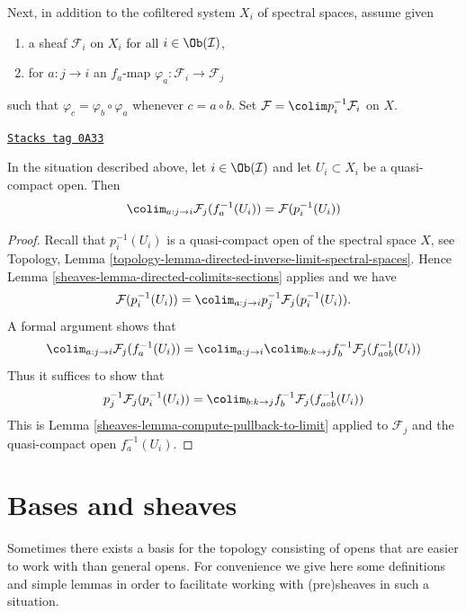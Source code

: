 Next, in addition to the cofiltered system $X_i$ of spectral spaces,
assume given
\begin{enumerate}
\item a sheaf $\mathcal{F}_i$ on $X_i$ for all $i \in \Ob(\mathcal{I})$,
\item for $a : j \to i$ an $f_a$-map
$\varphi_a : \mathcal{F}_i \to \mathcal{F}_j$
\end{enumerate}
such that $\varphi_c = \varphi_b \circ \varphi_a$
whenever $c = a \circ b$. Set $\mathcal{F} = \colim p_i^{-1}\mathcal{F}_i$
on $X$.

\begin{lemma}
\label{sheaves-lemma-descend-opens}
\href{https://stacks.math.columbia.edu/tag/0A33}{\texttt{Stacks tag 0A33}}

In the situation described above, let $i \in \Ob(\mathcal{I})$ and let
$U_i \subset X_i$ be a quasi-compact open. Then
$$
\colim_{a : j \to i} \mathcal{F}_j(f_a^{-1}(U_i)) = \mathcal{F}(p_i^{-1}(U_i))
$$
\end{lemma}

\begin{proof}

Recall that $p_i^{-1}(U_i)$ is a quasi-compact open of the spectral space
$X$, see
Topology, Lemma \ref{topology-lemma-directed-inverse-limit-spectral-spaces}.
Hence Lemma \ref{sheaves-lemma-directed-colimits-sections} applies and we have
$$
\mathcal{F}(p_i^{-1}(U_i)) =
\colim_{a : j \to i} p_j^{-1}\mathcal{F}_j(p_i^{-1}(U_i)).
$$
A formal argument shows that
$$
\colim_{a : j \to i} \mathcal{F}_j(f_a^{-1}(U_i)) =
\colim_{a : j \to i} \colim_{b : k \to j}
f_b^{-1}\mathcal{F}_j(f_{a \circ b}^{-1}(U_i))
$$
Thus it suffices to show that
$$
p_j^{-1}\mathcal{F}_j(p_i^{-1}(U_i)) =
\colim_{b : k \to j} f_b^{-1}\mathcal{F}_j(f_{a \circ b}^{-1}(U_i))
$$
This is Lemma \ref{sheaves-lemma-compute-pullback-to-limit}
applied to $\mathcal{F}_j$ and the quasi-compact open $f_a^{-1}(U_i)$.
\end{proof}

\section{Bases and sheaves}
\label{sheaves-section-bases}
Sometimes there exists a basis for the topology
consisting of opens that are easier to work with
than general opens. For convenience we give here
some definitions and simple lemmas in order to
facilitate working with (pre)sheaves in such a situation.

